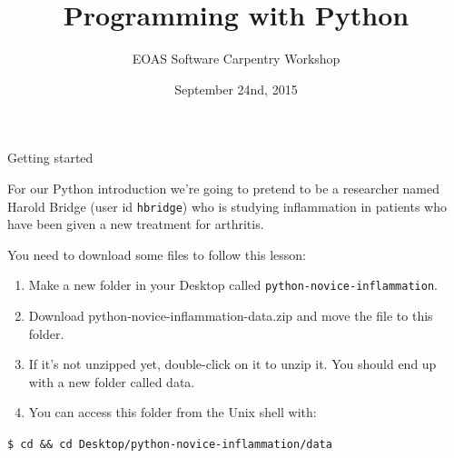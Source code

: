 \documentclass{beamer}
\title[Shell Lesson]{Programming with Python}
\subtitle[]{EOAS Software Carpentry Workshop }
\date[Sep 2015]{September 24nd, 2015}
\begin{document}





 
\begin{frame}[plain]
  
\titlepage


\end{frame}




\begin{frame}{Getting started}

\small{For our Python introduction we're going to pretend to be a researcher named Harold Bridge (user id \texttt{hbridge}) who is studying inflammation in patients who have been given a new treatment for arthritis.}
\vspace{0.5cm}

You need to download some files to follow this lesson:
\begin{enumerate}
 \item{Make a new folder in your Desktop called \texttt{python-novice-inflammation}.}
    \item{Download python-novice-inflammation-data.zip and move the file to this folder.}
    \item{If it's not unzipped yet, double-click on it to unzip it. You should end up with a new folder called data.}
   \item{You can access this folder from the Unix shell with:}
\end{enumerate}
\texttt{\$ cd \&\& cd Desktop/python-novice-inflammation/data}




\end{frame}

\end{document}
